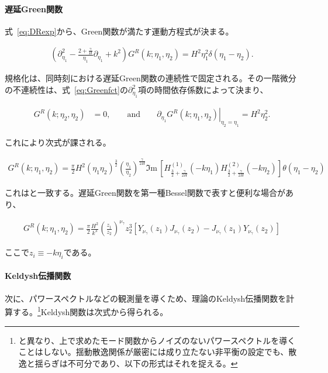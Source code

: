 \documentclass[a4paper,11pt]{ltjsarticle}
\numberwithin{equation}{section}
\newcommand{\Ima}{\Im \mathrm{m}\,}
\newcommand{\Eq}[1]{Eq.~(\ref{#1})}
\renewcommand{\Eq}[1]{式~\eqref{#1}}
\begin{document}
\paragraph{遅延Green関数} \Eq{eq:DRexp}から、Green関数が満たす運動方程式が決まる。

\begin{align}\label{eq:Greenfct}
\left(\partial_{\eta_1}^2 - \frac{2 + \frac{\gamma}{H}}{\eta_1}\partial_{\eta_1} + k^2  \right) G^{R} (k; \eta_1, \eta_2) = H^2 \eta_1^2 \delta(\eta_1-\eta_2).
\end{align}

規格化は、同時刻における遅延Green関数の連続性で固定される。その一階微分の不連続性は、\Eq{eq:Greenfct}の$\partial_{\eta_1}^2$項の時間依存係数によって決まり、

\begin{align}
G^R(k; \eta_2,\eta_2) &= 0, \qquad \mathrm{and} \qquad
\left. \partial_{\eta_1}G^R(k; \eta_1,\eta_2) \right|_{\eta_2 = \eta_1} = H^2 \eta^2_2.
\end{align}

これにより次式が課される。

\begin{align}\label{eq:GRfinsimp}
G^R(k; \eta_1,\eta_2) =  \frac{\pi}{2} H^2 (\eta_1 \eta_2)^{\frac{3}{2}}\left(\frac{\eta_1}{\eta_2} \right)^{\frac{\gamma}{2H}}  \Ima\left[H^{(1)}_{\frac{3}{2}+ \frac{\gamma}{2H}}(-k \eta_1) H^{(2)}_{\frac{3}{2}+ \frac{\gamma}{2H}}(-k\eta_2)   \right] \theta(\eta_1-\eta_2) 
\end{align}

これは\cite{LopezNacir:2011kk,Creminelli:2023aly}と一致する。遅延Green関数を第一種Bessel関数で表すと便利な場合があり、

\begin{align}\label{eq:GRfinsimpv2}
G^R(k;\eta_1,\eta_2) = \frac{\pi}{2} \frac{H^2}{k^3} \left(\frac{z_1}{z_2}\right)^{\nu_\gamma} z_2^{3}\left[Y_{\nu_\gamma}(z_1)J_{\nu_\gamma}(z_2) -J_{\nu_\gamma}(z_1)Y_{\nu_\gamma}(z_2) \right]
\end{align}

ここで$z_i\equiv-k\eta_i$である。

\paragraph{Keldysh伝播関数} 次に、パワースペクトルなどの観測量を導くため、理論のKeldysh伝播関数を計算する。\footnote{\cite{LopezNacir:2011kk,Creminelli:2023aly}と異なり、上で求めたモード関数からノイズのないパワースペクトルを導くことはしない。揺動散逸関係が厳密には成り立たない非平衡の設定でも、散逸と揺らぎは不可分であり\cite{Calzetta:2008iqa,Kamenev:2009jj}、以下の形式はそれを捉える。}Keldysh関数は次式から得られる。
\end{document}
